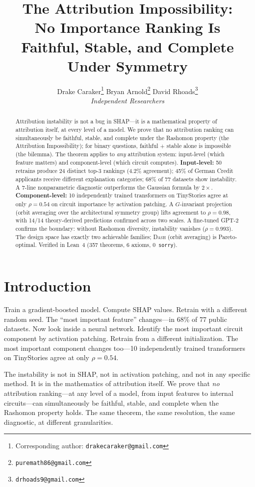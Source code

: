 \documentclass{article}
\title{The Attribution Impossibility:\\{\large No Importance Ranking Is Faithful, Stable, and Complete Under Symmetry}}
\author{
  Drake Caraker\thanks{Corresponding author: \texttt{drakecaraker@gmail.com}} \quad
  Bryan Arnold\thanks{\texttt{puremath86@gmail.com}} \quad
  David Rhoads\thanks{\texttt{drhoads9@gmail.com}} \\[4pt]
  \textit{Independent Researchers}
}
\newcommand{\DASH}{\textsc{Dash}}
\begin{document}
\maketitle

\begin{abstract}
Attribution instability is not a bug in SHAP---it is a mathematical property of attribution itself, at every level of a model.
We prove that no attribution ranking can simultaneously be faithful, stable, and complete under the Rashomon property (the Attribution Impossibility); for binary questions, faithful + stable alone is impossible (the bilemma). The theorem applies to \emph{any} attribution system: input-level (which feature matters) and component-level (which circuit computes).
\textbf{Input-level:} 50 retrains produce 24 distinct top-3 rankings (4.2\% agreement); 45\% of German Credit applicants receive different explanation categories; 68\% of 77 datasets show instability. A 7-line nonparametric diagnostic outperforms the Gaussian formula by $2\times$.
\textbf{Component-level:} 10 independently trained transformers on TinyStories agree at only $\rho{=}0.54$ on circuit importance by activation patching. A $G$-invariant projection (orbit averaging over the architectural symmetry group) lifts agreement to $\rho{=}0.98$, with 14/14 theory-derived predictions confirmed across two scales. A fine-tuned GPT-2 confirms the boundary: without Rashomon diversity, instability vanishes ($\rho{=}0.993$).
The design space has exactly two achievable families; \DASH{} (orbit averaging) is Pareto-optimal. Verified in Lean~4 (357 theorems, 6 axioms, 0~\texttt{sorry}).
\end{abstract}

\section{Introduction}
\label{sec:intro}

Train a gradient-boosted model. Compute SHAP values. Retrain with a different random seed. The ``most important feature'' changes---in 68\% of 77 public datasets.
Now look inside a neural network. Identify the most important circuit component by activation patching. Retrain from a different initialization. The most important component changes too---10 independently trained transformers on TinyStories agree at only $\rho = 0.54$.

The instability is not in SHAP, not in activation patching, and not in any specific method. It is in the mathematics of attribution itself. We prove that \emph{no} attribution ranking---at any level of a model, from input features to internal circuits---can simultaneously be faithful, stable, and complete when the Rashomon property holds. The same theorem, the same resolution, the same diagnostic, at different granularities.
\end{document}
